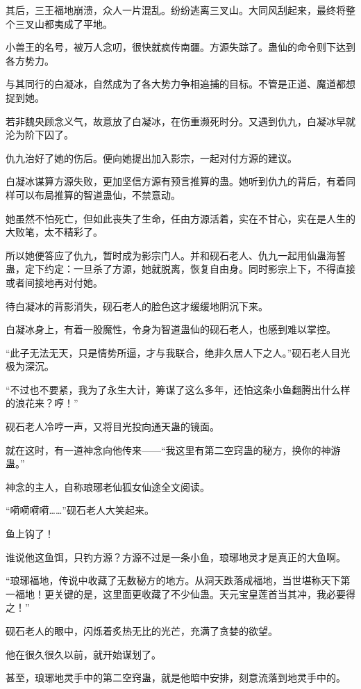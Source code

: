 \begin{this_body}
其后，三王福地崩溃，众人一片混乱。纷纷逃离三叉山。大同风刮起来，最终将整个三叉山都夷成了平地。

小兽王的名号，被万人念叨，很快就疯传南疆。方源失踪了。蛊仙的命令则下达到各方势力。

与其同行的白凝冰，自然成为了各大势力争相追捕的目标。不管是正道、魔道都想捉到她。

若非魏央顾念义气，故意放了白凝冰，在伤重濒死时分。又遇到仇九，白凝冰早就沦为阶下囚了。

仇九治好了她的伤后。便向她提出加入影宗，一起对付方源的建议。

白凝冰谋算方源失败，更加坚信方源有预言推算的蛊。她听到仇九的背后，有着同样可以布局推算的智道蛊仙，不禁意动。

她虽然不怕死亡，但如此丧失了生命，任由方源活着，实在不甘心，实在是人生的大败笔，太不精彩了。

所以她便答应了仇九，暂时成为影宗门人。并和砚石老人、仇九一起用仙蛊海誓蛊，定下约定：一旦杀了方源，她就脱离，恢复自由身。同时影宗上下，不得直接或者间接地再对付她。

待白凝冰的背影消失，砚石老人的脸色这才缓缓地阴沉下来。

白凝冰身上，有着一股魔性，令身为智道蛊仙的砚石老人，也感到难以掌控。

“此子无法无天，只是情势所逼，才与我联合，绝非久居人下之人。”砚石老人目光极为深沉。

“不过也不要紧，我为了永生大计，筹谋了这么多年，还怕这条小鱼翻腾出什么样的浪花来？哼！”

砚石老人冷哼一声，又将目光投向通天蛊的镜面。

就在这时，有一道神念向他传来——“我这里有第二空窍蛊的秘方，换你的神游蛊。”

神念的主人，自称琅琊老仙狐女仙途全文阅读。

“嗬嗬嗬嗬……”砚石老人大笑起来。

鱼上钩了！

谁说他这鱼饵，只钓方源？方源不过是一条小鱼，琅琊地灵才是真正的大鱼啊。

“琅琊福地，传说中收藏了无数秘方的地方。从洞天跌落成福地，当世堪称天下第一福地！更关键的是，这里面更收藏了不少仙蛊。天元宝皇莲首当其冲，我必要得之！”

砚石老人的眼中，闪烁着炙热无比的光芒，充满了贪婪的欲望。

他在很久很久以前，就开始谋划了。

甚至，琅琊地灵手中的第二空窍蛊，就是他暗中安排，刻意流落到地灵手中的。


\end{this_body}
